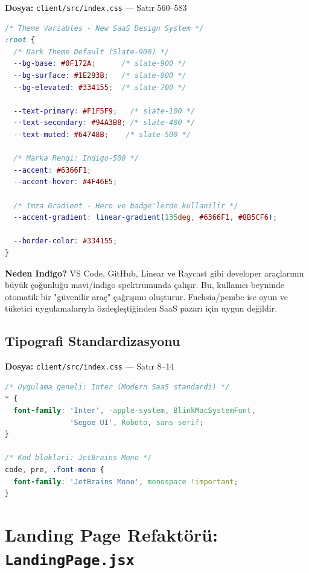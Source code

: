 \documentclass[12pt,a4paper]{article}
\begin{document}
\textbf{Dosya:} \texttt{client/src/index.css} — Satır 560--583

\begin{lstlisting}[language=CSS, caption={Yeni SaaS Design Token Sistemi - index.css:560}]
/* Theme Variables - New SaaS Design System */
:root {
  /* Dark Theme Default (Slate-900) */
  --bg-base: #0F172A;      /* slate-900 */
  --bg-surface: #1E293B;   /* slate-800 */
  --bg-elevated: #334155;  /* slate-700 */

  --text-primary: #F1F5F9;   /* slate-100 */
  --text-secondary: #94A3B8; /* slate-400 */
  --text-muted: #64748B;    /* slate-500 */

  /* Marka Rengi: Indigo-500 */
  --accent: #6366F1;
  --accent-hover: #4F46E5;

  /* Imza Gradient - Hero ve badge'lerde kullanilir */
  --accent-gradient: linear-gradient(135deg, #6366F1, #8B5CF6);

  --border-color: #334155;
}
\end{lstlisting}

\begin{keypoint}
\textbf{Neden Indigo?} VS Code, GitHub, Linear ve Raycast gibi developer araçlarının büyük çoğunluğu mavi/indigo spektrumunda çalışır. Bu, kullanıcı beyninde otomatik bir "güvenilir araç" çağrışımı oluşturur. Fuchsia/pembe ise oyun ve tüketici uygulamalarıyla özdeşleştiğinden SaaS pazarı için uygun değildir.
\end{keypoint}

\subsection{Tipografi Standardizasyonu}

\textbf{Dosya:} \texttt{client/src/index.css} — Satır 8--14

\begin{lstlisting}[language=CSS, caption={Font Standardizasyonu - index.css:8}]
/* Uygulama geneli: Inter (Modern SaaS standardi) */
* {
  font-family: 'Inter', -apple-system, BlinkMacSystemFont,
               'Segoe UI', Roboto, sans-serif;
}

/* Kod bloklari: JetBrains Mono */
code, pre, .font-mono {
  font-family: 'JetBrains Mono', monospace !important;
}
\end{lstlisting}

\section{Landing Page Refaktörü: \texttt{LandingPage.jsx}}
\end{document}
